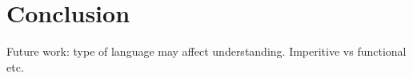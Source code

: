 
\chapter{Conclusion}
\label{cha:conclusion}


Future work: type of language may affect understanding. Imperitive vs functional etc.

